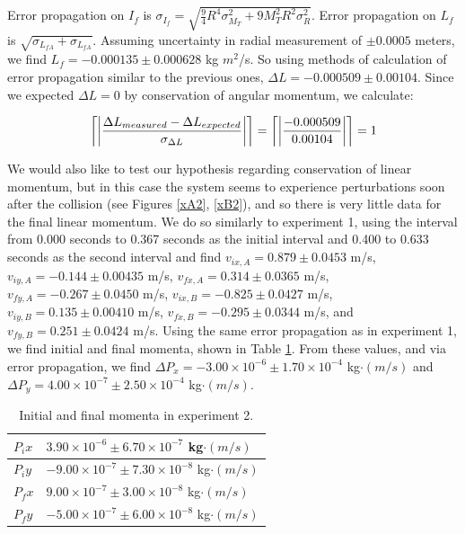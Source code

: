 \documentclass[11pt]{article}
\DeclarePairedDelimiter{\ceil}{\lceil}{\rceil}
\begin{document}
Error propagation on $I_f$ is $\sigma_{I_f} = \sqrt{\frac{9}{4}R^4\sigma_{M_T}^2+9M_T^2R^2\sigma_{R}^2}$. Error propagation on $L_f$ is $\sqrt{\sigma_{L_{fA}}+\sigma_{L_{fA}}}$. Assuming uncertainty in radial measurement of $\pm 0.0005$ meters, we find $L_f = -0.000135\pm 0.000628$ kg $m^2$/s. So using methods of calculation of error propagation similar to the previous ones, $\Delta L = -0.000509 \pm 0.00104$. Since we expected $\Delta L = 0$ by conservation of angular momentum, we calculate:

\begin{align}
\ceil*{\left\vert\frac{\Delta L_{measured}-\Delta L_{expected}}{\sigma_{\Delta L}}\right\vert} = \ceil*{\left\vert\frac{-0.000509}{0.00104}\right\vert} = 1
\label{errL}
\end{align}

We would also like to test our hypothesis regarding conservation of linear momentum, but in this case the system seems to experience perturbations soon after the collision (see Figures \ref{xA2}, \ref{xB2}), and so there is very little data for the final linear momentum. We do so similarly to experiment 1, using the interval from 0.000 seconds to 0.367 seconds as the initial interval and 0.400 to 0.633 seconds as the second interval and find $v_{ix,A} = 0.879\pm0.0453$ m/s, $v_{iy,A} = -0.144\pm0.00435$ m/s, $v_{fx,A} = 0.314\pm0.0365$ m/s, $v_{fy,A} = -0.267\pm0.0450$ m/s, $v_{ix,B} = -0.825\pm0.0427$ m/s, $v_{iy,B} = 0.135\pm0.00410$ m/s, $v_{fx,B} = -0.295\pm0.0344$ m/s, and $v_{fy,B} = 0.251\pm0.0424$ m/s. Using the same error propagation as in experiment 1, we find initial and final momenta, shown in Table \ref{mom2}. From these values, and via error propagation, we find $\Delta P_x = -3.00\times10^{-6}\pm1.70\times 10^{-4}$ kg$\cdot(m/s)$ and $\Delta P_y = 4.00\times10^{-7}\pm2.50\times10^{-4}$ kg$\cdot(m/s)$.

\begin{table}[]
\centering
\caption{Initial and final momenta in experiment 2.}
\label{mom2}
\begin{tabular}{|l|l|}
\hline
$P_ix$ & $3.90\times10^{-6}\pm6.70\times10^{-7}$ kg$\cdot(m/s)$   \\ \hline
$P_iy$ & $-9.00\times10^{-7}\pm 7.30\times10^{-8}$ kg$\cdot(m/s)$ \\ \hline
$P_fx$ & $9.00\times10^{-7}\pm 3.00\times 10^{-8}$  kg$\cdot(m/s)$ \\ \hline
$P_fy$ & $-5.00\times10^{-7} \pm 6.00\times 10^{-8}$ kg$\cdot(m/s)$\\ \hline
\end{tabular}
\end{table}
\end{document}
